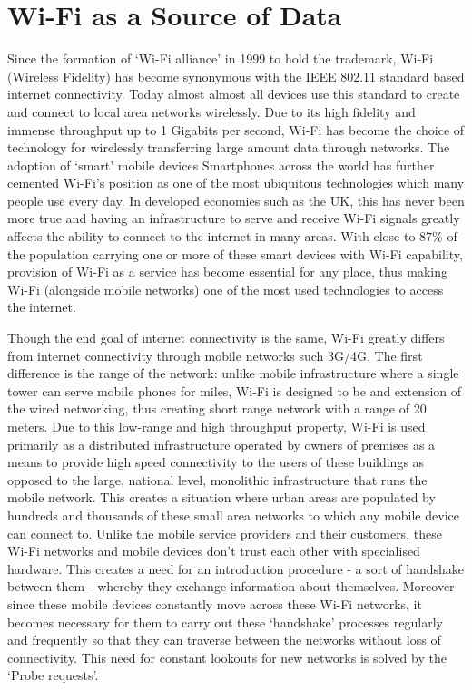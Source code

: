 \section{Wi-Fi as a Source of Data} \label{wifi-as-source-of-data}

Since the formation of `Wi-Fi alliance' in 1999 to hold the trademark, Wi-Fi (Wireless Fidelity) has become synonymous with the IEEE 802.11 standard based internet connectivity.
Today almost almost all devices use this standard to create and connect to local area networks wirelessly.
Due to its high fidelity and immense throughput up to 1 Gigabits per second, Wi-Fi has become the choice of technology for wirelessly transferring large amount data through networks.
The adoption of `smart' mobile devices Smartphones across the world has further cemented Wi-Fi's position as one of the most ubiquitous technologies which many people use every day.
In developed economies such as the UK, this has never been more true and having an infrastructure to serve and receive Wi-Fi signals greatly affects the ability to connect to the internet in many areas.
With close to 87\%\cite{deloitte2018} of the population carrying one or more of these smart devices with Wi-Fi capability, provision of Wi-Fi as a service has become essential for any place, thus making Wi-Fi (alongside mobile networks) one of the most used technologies to access the internet.

Though the end goal of internet connectivity is the same, Wi-Fi greatly differs from internet connectivity through mobile networks such 3G/4G.
The first difference is the range of the network: unlike mobile infrastructure where a single tower can serve mobile phones for miles, Wi-Fi is designed to be and extension of the wired networking, thus creating short range network with a range of 20 meters.
Due to this low-range and high throughput property, Wi-Fi is used primarily as a distributed infrastructure operated by owners of premises as a means to provide high speed connectivity to the users of these buildings as opposed to the large, national level, monolithic infrastructure that runs the mobile network.
This creates a situation where urban areas are populated by hundreds and thousands of these small area networks to which any mobile device can connect to.
Unlike the mobile service providers and their customers, these Wi-Fi networks and mobile devices don't trust each other with specialised hardware.
This creates a need for an introduction procedure - a sort of handshake between them - whereby they exchange information about themselves. 
Moreover since these mobile devices constantly move across these Wi-Fi networks, it becomes necessary for them to carry out these `handshake' processes regularly and frequently so that they can traverse between the networks without loss of connectivity.
This need for constant lookouts for new networks is solved by the `Probe requests'.

